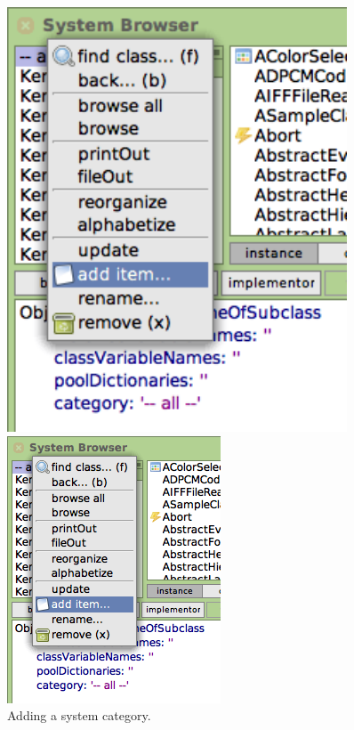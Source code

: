 \documentclass[a4paper,10pt,twoside]{book}
\begin{document}
\begin{figure}[htb]
\begin{minipage}[b]{0.48\textwidth}
\ifluluelse
	{\centerline {\includegraphics[width=0.9\textwidth]{AddCategory}}}
	{\centerline {\includegraphics[scale=0.7]{AddCategory}}}
	\caption{Adding a system category.
	\label{fig:addCategory}}
\end{minipage}
\hfill
\begin{minipage}[b]{0.48\textwidth}
\ifluluelse

\end{minipage}
\end{figure}
\end{document}
